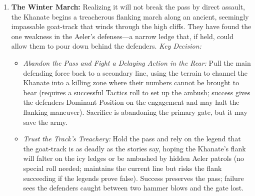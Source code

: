 \documentclass[11pt]{article}
\begin{document}
\begin{enumerate}
\begin{itemize}
\end{itemize}
\item \textbf{The Winter March:} Realizing it will not break the pass by direct assault, the Khanate begins a treacherous flanking march along an ancient, seemingly impassable goat-track that winds through the high cliffs. They have found the one weakness in the Aeler's defenses—a narrow ledge that, if held, could allow them to pour down behind the defenders. \textit{Key Decision:}
\begin{itemize}
\item \textit{Abandon the Pass and Fight a Delaying Action in the Rear:} Pull the main defending force back to a secondary line, using the terrain to channel the Khanate into a killing zone where their numbers cannot be brought to bear (requires a successful Tactics roll to set up the ambush; success gives the defenders Dominant Position on the engagement and may halt the flanking maneuver). Sacrifice is abandoning the primary gate, but it may save the army.
\item \textit{Trust the Track's Treachery:} Hold the pass and rely on the legend that the goat-track is as deadly as the stories say, hoping the Khanate's flank will falter on the icy ledges or be ambushed by hidden Aeler patrols (no special roll needed; maintains the current line but risks the flank succeeding if the legends prove false). Success preserves the pass; failure sees the defenders caught between two hammer blows and the gate lost.
\end{itemize}
\end{enumerate}
\end{document}
